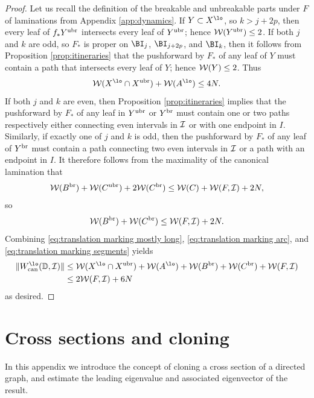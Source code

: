 \documentclass[12pt]{amsart}
\begin{document}
\begin{proof}
    Let us recall the definition of the breakable and unbreakable parts under $F$ of laminations from Appendix \ref{app:dynamics}.
	If $Y\subset X^\lo$, so $k > j+2p$, then every leaf of $f_*Y^{\mathrm{ubr}}$ intersects every leaf of $Y^{\mathrm{ubr}}$; hence $\mathcal W(Y^{\mathrm{ubr}})\leq 2$.
	If both $j$ and $k$ are odd, so $F_*$ is proper on $\BI_j$, $\BI_{j+2p}$, and $\BI_k$, then it 
	follows from Proposition \ref{prop:itineraries} that the pushforward by $F_*$ of any leaf of $Y$ must contain a path that intersects every leaf of $Y$; hence $\mathcal W(Y)\leq 2$.
	Thus 
	\begin{equation}\label{eq:translation marking arc}
		\WW(X^\lo\cap X^\nbr)+ \WW(A^\lo) \leq 4N.
	\end{equation}
	If both $j$ and $k$ are even, then Proposition \ref{prop:itineraries} implies that the pushforward 
	by $F_*$ of any leaf in $Y^{\mathrm{ubr}}$ or $Y^{\mathrm{br}}$ must contain one or two paths respectively either connecting even intervals in  $\mathcal I$ or with one endpoint in $I$. Similarly, if exactly one of $j$ and $k$ is odd, then the pushforward by $F_*$ of any leaf of $Y^{\mathrm{br}}$ must contain a path 
	connecting two even intervals in $\mathcal I$ or a path with an endpoint in $I$. 
	It therefore follows from the maximality of the canonical lamination that 
	$$\mathcal W(B^{\mathrm{br}})+\mathcal W(C^{\mathrm{ubr}})+ 2\mathcal W(C^{\mathrm{br}})\leq \mathcal W(C)+\mathcal W(F, \mathcal I)+2N,$$
	so 
	\begin{equation}\label{eq:translation marking segments}
		\mathcal W(B^{\mathrm{br}})+\mathcal W(C^{\mathrm{br}})\leq \mathcal W(F, \mathcal I)+2N.
	\end{equation}
	Combining  \eqref{eq:translation marking mostly long}, \eqref{eq:translation marking arc}, and \eqref{eq:translation marking segments} yields
	\begin{align*}
		\|\wcan^\lo(\D, \II)\|&\leq \WW(X^\lo\cap X^\nbr)+ \WW(A^\lo)+ \WW(B^\br)+\WW(C^\br)+\WW(F, \II)\\
		&\leq 2\WW(F, \II)+6N
	\end{align*}
	as desired.
\end{proof}

\section{Cross sections and cloning} \label{app:clones}

In this appendix we introduce the concept of cloning a cross section of a directed graph, and estimate the leading eigenvalue and associated eigenvector of the result. 
\end{document}
